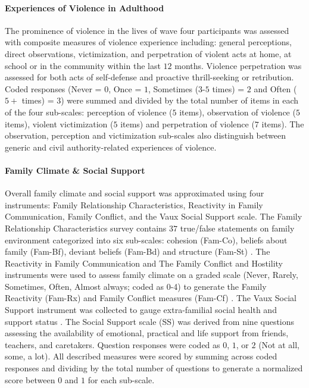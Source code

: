 \documentclass[utf8]{article}
\begin{document}
\paragraph{Experiences of Violence in Adulthood} The prominence of violence in the lives of wave four participants was assessed with composite measures of violence experience including: general perceptions, direct observations, victimization, and perpetration of violent acts at home, at school or in the community within the last $12$ months. Violence perpetration was assessed for both acts of self-defense and proactive thrill-seeking or retribution. Coded responses (Never = $0$, Once = $1$, Sometimes ($3$-$5$ times) = $2$ and Often ($5+$ times) = $3$) were summed and divided by the total number of items in each of the four sub-scales: perception of violence ($5$ items), observation of violence ($5$ items), violent victimization ($5$ items) and perpetration of violence ($7$ items). The observation, perception and victimization sub-scales also distinguish between generic and civil authority-related experiences of violence. 
\paragraph{Family Climate \& Social Support}
Overall family climate and social support was approximated using four instruments: Family Relationship Characteristics, Reactivity in Family Communication, Family Conflict, and the Vaux Social Support scale. The Family Relationship Characteristics survey contains $37$ true/false statements on family environment categorized into six sub-scales: cohesion (Fam-Co), beliefs about family (Fam-Bf), deviant beliefs (Fam-Bd) and structure (Fam-St) \citep{tolan1997assessment}. The Reactivity in Family Communication and The Family Conflict and Hostility instruments were used to assess family climate on a graded scale (Never, Rarely, Sometimes, Often, Almost always; coded as 0-4) to generate the Family Reactivity (Fam-Rx) and Family Conflict measures (Fam-Cf) \citep{thornberry2003gangs,henry2004study}. The Vaux Social Support instrument was collected to gauge extra-familial social health and support status \citep{vaux1988social}. The Social Support scale (SS) was derived from nine questions assessing the availability of emotional, practical and life support from friends, teachers, and caretakers. Question responses were coded as $0$, $1$, or $2$ (Not at all, some, a lot). All described measures were scored by summing across coded responses and dividing by the total number of questions to generate a normalized score between $0$ and $1$ for each sub-scale.
\end{document}
